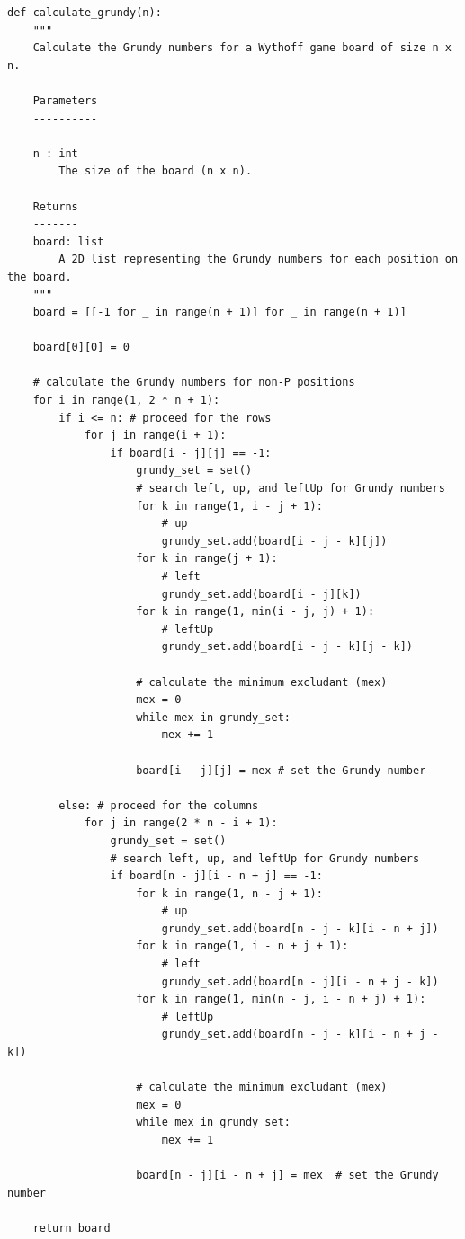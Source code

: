 \documentclass[uplatex,dvipdfmx,a4paper,10pt]{jsarticle}
\theoremstyle{definition}
\begin{document}
\begin{lstlisting}[caption={コーナー・ザ・クイーンのグランディ数を求めるプログラム}, label={code_corner_the_queen}]
def calculate_grundy(n):
    """
    Calculate the Grundy numbers for a Wythoff game board of size n x n.
    
    Parameters
    ----------

    n : int
        The size of the board (n x n).

    Returns
    -------
    board: list
        A 2D list representing the Grundy numbers for each position on the board.
    """
    board = [[-1 for _ in range(n + 1)] for _ in range(n + 1)]

    board[0][0] = 0

    # calculate the Grundy numbers for non-P positions
    for i in range(1, 2 * n + 1):
        if i <= n: # proceed for the rows
            for j in range(i + 1):
                if board[i - j][j] == -1:
                    grundy_set = set()
                    # search left, up, and leftUp for Grundy numbers
                    for k in range(1, i - j + 1):
                        # up
                        grundy_set.add(board[i - j - k][j])
                    for k in range(j + 1):
                        # left
                        grundy_set.add(board[i - j][k])
                    for k in range(1, min(i - j, j) + 1):
                        # leftUp
                        grundy_set.add(board[i - j - k][j - k])

                    # calculate the minimum excludant (mex)
                    mex = 0
                    while mex in grundy_set:
                        mex += 1

                    board[i - j][j] = mex # set the Grundy number

        else: # proceed for the columns
            for j in range(2 * n - i + 1):
                grundy_set = set()
                # search left, up, and leftUp for Grundy numbers
                if board[n - j][i - n + j] == -1:
                    for k in range(1, n - j + 1):
                        # up
                        grundy_set.add(board[n - j - k][i - n + j])
                    for k in range(1, i - n + j + 1):
                        # left
                        grundy_set.add(board[n - j][i - n + j - k])
                    for k in range(1, min(n - j, i - n + j) + 1):
                        # leftUp
                        grundy_set.add(board[n - j - k][i - n + j - k])

                    # calculate the minimum excludant (mex)
                    mex = 0
                    while mex in grundy_set:
                        mex += 1

                    board[n - j][i - n + j] = mex  # set the Grundy number

    return board

\end{lstlisting}
\end{document}
